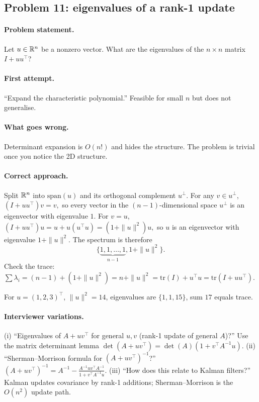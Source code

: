 \subsection{Problem 11: eigenvalues of a rank-1 update}
\label{sec:rank1}

\paragraph{Problem statement.}
Let $u \in \mathbb{R}^n$ be a nonzero vector.  What are the eigenvalues of
the $n \times n$ matrix $I + u u^\top$?

\paragraph{First attempt.}
``Expand the characteristic polynomial.''  Feasible for small $n$
but does not generalise.

\paragraph{What goes wrong.}
Determinant expansion is $O(n!)$ and hides the structure.  The
problem is trivial once you notice the 2D structure.

\paragraph{Correct approach.}
Split $\mathbb{R}^n$ into $\mathrm{span}(u)$ and its orthogonal
complement $u^\perp$.  For any $v \in u^\perp$,
\(
(I + u u^\top) v = v,
\)
so every vector in the $(n-1)$-dimensional space $u^\perp$ is an
eigenvector with eigenvalue $1$.  For $v = u$,
\(
(I + u u^\top) u = u + u (u^\top u) = (1 + \|u\|^2) u,
\)
so $u$ is an eigenvector with eigenvalue $1 + \|u\|^2$.  The
spectrum is therefore
\[
\{\underbrace{1, 1, \dots, 1}_{n-1}, 1 + \|u\|^2\}.
\]
Check the trace: $\sum \lambda_i = (n-1) + (1 + \|u\|^2)
= n + \|u\|^2 = \mathrm{tr}(I) + u^\top u = \mathrm{tr}(I + uu^\top)$. \checkmark

For $u = (1,2,3)^\top$, $\|u\|^2 = 14$, eigenvalues are
$\{1, 1, 15\}$, sum $17$ equals trace.

\paragraph{Interviewer variations.}
(i) ``Eigenvalues of $A + uv^\top$ for general $u, v$ (rank-1
update of general $A$)?''  Use the matrix determinant lemma
$\det(A + uv^\top) = \det(A)(1 + v^\top A^{-1} u)$.  (ii)
``Sherman--Morrison formula for $(A + uv^\top)^{-1}$?''
\(
(A + uv^\top)^{-1}
= A^{-1} - \tfrac{A^{-1} u v^\top A^{-1}}{1 + v^\top A^{-1} u}.
\)
(iii) ``How does this relate to Kalman filters?''  Kalman updates
covariance by rank-1 additions; Sherman--Morrison is the
$O(n^2)$ update path.

